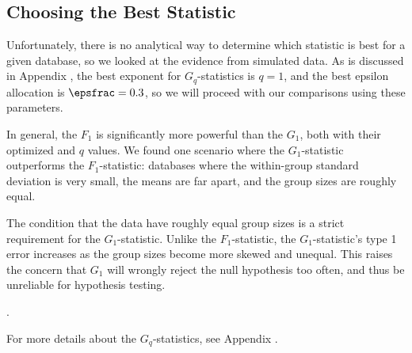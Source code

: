 \subsection{Choosing the Best Statistic}
Unfortunately, there is no analytical way to determine which statistic is best for a given database, so we looked at the evidence from simulated data. As is discussed in Appendix , the best exponent for $G_q$-statistics is $q=1$, and the best epsilon allocation is $\epsfrac = 0.3$, so we will proceed with our comparisons using these parameters. 

In general, the $F_1$ is significantly more powerful than the $G_1$, both with their optimized \epsfrac and $q$ values. We found one scenario where the $G_1$-statistic outperforms the $F_1$-statistic: databases where the within-group standard deviation is very small,  the means are far apart, and the group sizes are roughly equal. 

The condition that the data have roughly equal group sizes is a strict requirement for the $G_1$-statistic. Unlike the $F_1$-statistic, the $G_1$-statistic's type 1 error increases as the group sizes become more skewed and unequal. This raises the concern that $G_1$ will wrongly reject the null hypothesis too often, and thus be unreliable for hypothesis testing. 

. 

For more details about the $G_q$-statistics, see Appendix .




